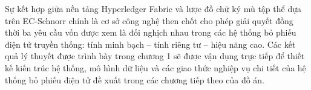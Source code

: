 Sự kết hợp giữa nền tảng Hyperledger Fabric và lược đồ chữ ký mù tập thể dựa trên EC-Schnorr chính là cơ sở công nghệ then chốt cho phép giải quyết đồng thời ba yêu cầu vốn được xem là đối nghịch nhau trong các hệ thống bỏ phiếu điện tử truyền thống: tính minh bạch -- tính riêng tư -- hiệu năng cao. Các kết quả lý thuyết được trình bày trong chương 1 sẽ được vận dụng trực tiếp để thiết kế kiến trúc hệ thống, mô hình dữ liệu và các giao thức nghiệp vụ chi tiết của hệ thống bỏ phiếu điện tử đề xuất trong các chương tiếp theo của đồ án.
